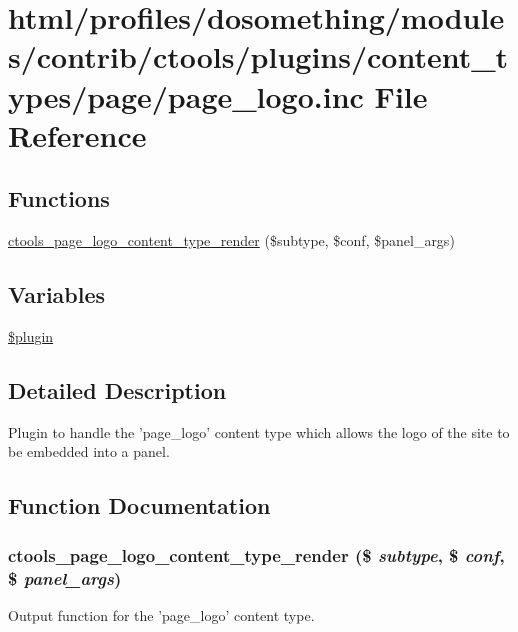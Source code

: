 \hypertarget{page__logo_8inc}{
\section{html/profiles/dosomething/modules/contrib/ctools/plugins/content\_\-types/page/page\_\-logo.inc File Reference}
\label{page__logo_8inc}
}
\subsection*{Functions}
\begin{DoxyCompactItemize}
\item 
\hyperlink{page__logo_8inc_a90e0dff30eed87901ed4f9ea7537473a}{ctools\_\-page\_\-logo\_\-content\_\-type\_\-render} (\$subtype, \$conf, \$panel\_\-args)
\end{DoxyCompactItemize}
\subsection*{Variables}
\begin{DoxyCompactItemize}
\item 
\hyperlink{page__logo_8inc_ada8a7130088351710bb02ed622d6bf65}{\$plugin}
\end{DoxyCompactItemize}


\subsection{Detailed Description}
Plugin to handle the 'page\_\-logo' content type which allows the logo of the site to be embedded into a panel. 

\subsection{Function Documentation}
\hypertarget{page__logo_8inc_a90e0dff30eed87901ed4f9ea7537473a}{
\subsubsection[{ctools\_\-page\_\-logo\_\-content\_\-type\_\-render}]{\setlength{\rightskip}{0pt plus 5cm}ctools\_\-page\_\-logo\_\-content\_\-type\_\-render (\$ {\em subtype}, \/  \$ {\em conf}, \/  \$ {\em panel\_\-args})}}
\label{page__logo_8inc_a90e0dff30eed87901ed4f9ea7537473a}
Output function for the 'page\_\-logo' content type.

